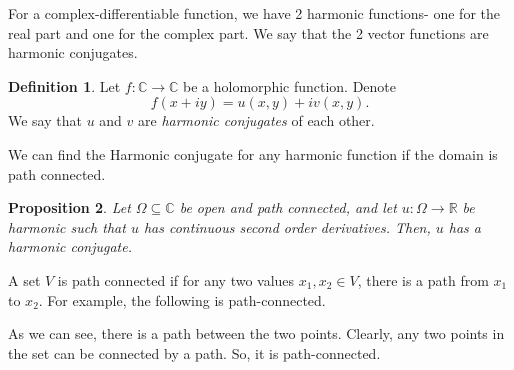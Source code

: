 \documentclass[a4paper, openany]{memoir}
\theoremstyle{definition}
\newtheorem{definition}{Definition}[section]
\theoremstyle{plain}
\newtheorem{proposition}[definition]{Proposition}
\begin{document}
For a complex-differentiable function, we have 2 harmonic functions- one for the real part and one for the complex part. We say that the 2 vector functions are harmonic conjugates.
\begin{definition}
Let $f: \mathbb{C} \to \mathbb{C}$ be a holomorphic function. Denote
\[f(x + iy) = u(x, y) + iv(x, y).\]
We say that $u$ and $v$ are \emph{harmonic conjugates} of each other.
\end{definition}
\noindent We can find the Harmonic conjugate for any harmonic function if the domain is path connected.
\begin{proposition}
Let $\Omega \subseteq \mathbb{C}$ be open and path connected, and let $u: \Omega \to \mathbb{R}$ be harmonic such that $u$ has continuous second order derivatives. Then, $u$ has a harmonic conjugate.
\end{proposition}
\noindent A set $V$ is path connected if for any two values $x_1, x_2 \in V$, there is a path from $x_1$ to $x_2$. For example, the following is path-connected.
\begin{figure}[H]
    \centering
\end{figure}
\noindent As we can see, there is a path between the two points. Clearly, any two points in the set can be connected by a path. So, it is path-connected.
\end{document}
